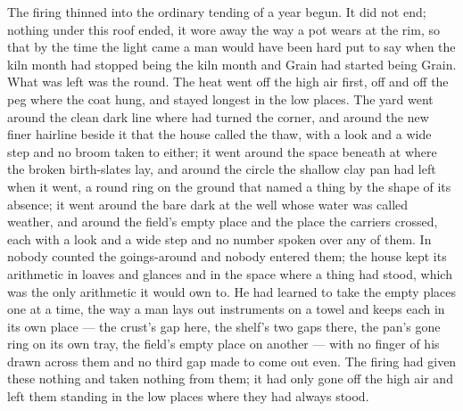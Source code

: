 \scenebreak

The firing thinned into the ordinary tending of a year begun. It did not end; nothing under this roof ended, it wore away the way a pot wears at the rim, so that by the time the light came a man would have been hard put to say when the kiln month had stopped being the kiln month and Grain had started being Grain. What was left was the round. The heat went off the high air first, off  and off the peg where the coat hung, and stayed longest in the low places. The yard went around the clean dark line where  had turned the corner, and around the new finer hairline beside it that the house called the thaw, with a look and a wide step and no broom taken to either; it went around the space beneath  at  where the broken birth-slates lay, and around the circle the shallow clay pan had left when it went, a round ring on the ground that named a thing by the shape of its absence; it went around the bare dark  at the well whose water was called weather, and around the field's empty place and the place the carriers crossed, each with a look and a wide step and no number spoken over any of them. In  nobody counted the goings-around and nobody entered them; the house kept its arithmetic in loaves and glances and in the space where a thing had stood, which was the only arithmetic it would own to. He had learned to take the empty places one at a time, the way a man lays out instruments on a towel and keeps each in its own place --- the crust's gap here, the shelf's two gaps there, the pan's gone ring on its own tray, the field's empty place on another --- with no finger of his drawn across them and no third gap made to come out even. The firing had given these nothing and taken nothing from them; it had only gone off the high air and left them standing in the low places where they had always stood.

\scenebreak

